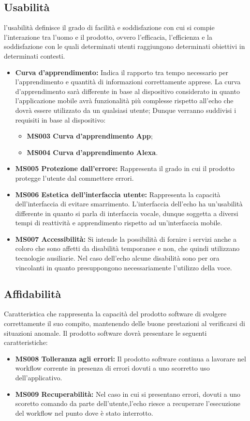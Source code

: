 \subsection{Usabilità}
l'usabilità definisce il grado di facilità e soddisfazione con cui si compie l'interazione tra l'uomo e il prodotto, ovvero l'efficacia, l'efficienza e la soddisfazione con le quali determinati utenti raggiungono determinati obiettivi in determinati contesti.
\begin{itemize}
	\item \textbf{Curva d'apprendimento:} Indica il rapporto tra tempo necessario per l'apprendimento e quantità di informazioni correttamente apprese.
	La curva d'apprendimento sarà differente in base al dispositivo considerato in quanto l'applicazione mobile avrà funzionalità più complesse rispetto all'echo che dovrà essere utilizzato da un qualsiasi utente;
	Dunque verranno suddivisi i requisiti in base al dispositivo:
	\begin{itemize}
		\item \textbf{MS003 Curva d'apprendimento App};
		\item \textbf{MS004 Curva d'apprendimento Alexa}.
	\end{itemize}
	\item \textbf{MS005 Protezione dall'errore:} Rappresenta il grado in cui il prodotto protegge l'utente dal commettere errori.
	\item \textbf{MS006 Estetica dell'interfaccia utente:} Rappresenta la capacità dell'interfaccia di evitare smarrimento.
	L'interfaccia dell'echo ha un'usabilità differente  in quanto si parla di interfaccia vocale, dunque soggetta a diversi tempi di reattività e apprendimento rispetto ad un'interfaccia mobile.
	\item \textbf{MS007 Accessibilità:}  Si intende la possibilità di fornire i servizi anche a coloro che sono affetti da disabilità temporanee e non, che quindi utilizzano tecnologie ausiliarie.
	Nel caso dell'echo alcune disabilità sono per ora vincolanti in quanto presuppongono necessariamente l'utilizzo della voce.
\end{itemize}
\subsection{Affidabilità}
Caratteristica che rappresenta la capacità del prodotto software di svolgere correttamente il suo compito, mantenendo delle buone prestazioni al verificarsi di situazioni anomale. 
Il prodotto software dovrà presentare le seguenti caratteristiche:
 \begin{itemize}
	\item \textbf{MS008 Tolleranza agli errori:} Il prodotto software continua a lavorare nel workflow corrente in presenza di errori dovuti a uno scorretto uso dell'applicativo.
	\item \textbf{MS009 Recuperabilità:} Nel caso in cui si presentano errori, dovuti a uno scoretto comando da parte dell'utente,l'echo riesce a recuperare l'esecuzione  del workflow nel punto dove è stato interrotto.
\end{itemize}
